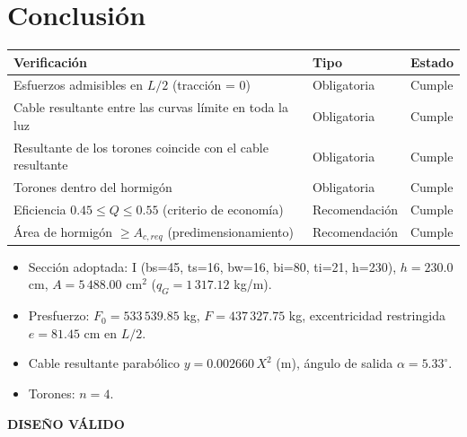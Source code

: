 \documentclass[11pt,a4paper]{article}
\begin{document}
\section{Conclusión}
\begin{center}
\begin{tabular}{>{\raggedright\arraybackslash}p{9cm}ll}
\toprule
Verificación & Tipo & Estado \\
\midrule
Esfuerzos admisibles en $L/2$ (tracción = 0) & Obligatoria & \textcolor{verde}{Cumple} \\
Cable resultante entre las curvas límite en toda la luz & Obligatoria & \textcolor{verde}{Cumple} \\
Resultante de los torones coincide con el cable resultante & Obligatoria & \textcolor{verde}{Cumple} \\
Torones dentro del hormigón & Obligatoria & \textcolor{verde}{Cumple} \\
Eficiencia $0.45 \le Q \le 0.55$ (criterio de economía) & Recomendación & \textcolor{verde}{Cumple} \\
Área de hormigón $\ge A_{c,req}$ (predimensionamiento) & Recomendación & \textcolor{verde}{Cumple} \\
\bottomrule
\end{tabular}
\end{center}
\begin{itemize}
\item Sección adoptada: I  (bs=45, ts=16, bw=16, bi=80, ti=21, h=230), $h = 230.0$ cm, $A = 5\,488.00$ cm$^2$ ($q_G = 1\,317.12$ kg/m).
\item Presfuerzo: $F_0 = 533\,539.85$ kg, $F = 437\,327.75$ kg, excentricidad restringida $e = 81.45$ cm en $L/2$.
\item Cable resultante parabólico $y = 0.002660\,X^2$ (m), ángulo de salida $\alpha = 5.33^\circ$.
\item Torones: $n = 4$.
\end{itemize}
\begin{center}\Large \textcolor{verde}{\textbf{DISEÑO VÁLIDO}}\end{center}
\end{document}
